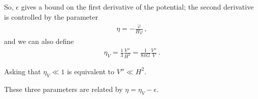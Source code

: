 \documentclass[main.tex]{subfiles}
\begin{document}
So, \(\epsilon \) gives a bound on the first derivative of the potential; the second derivative is controlled by the parameter 
%
\begin{align}
\eta = - \frac{\ddot{\varphi}}{H \dot{\varphi}
}
\,,
\end{align}
%
and we can also define 
%
\begin{align}
\eta _V = \frac{1}{3} \frac{V''}{H^2} = \frac{1}{8 \pi G} \frac{V''}{V}
\,.
\end{align}

Asking that \(\eta _V \ll 1 \) is equivalent to \(V'' \ll H^2\). 

These three parameters are related by \(\eta = \eta _V - \epsilon \).
\end{document}
